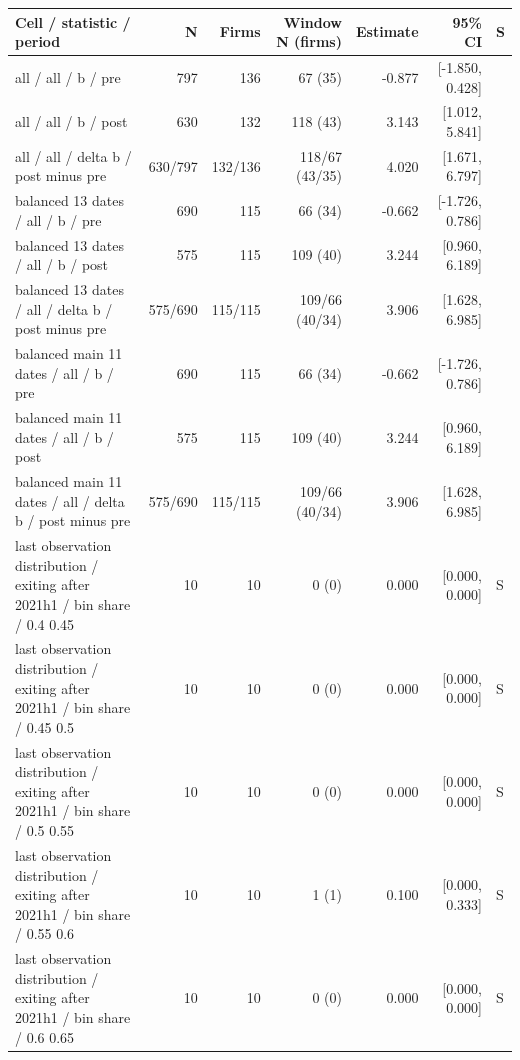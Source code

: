 \begingroup\scriptsize\setlength{\tabcolsep}{3pt}
\begin{threeparttable}
\begin{tabular}{p{5.7cm}rrrrrl}
\toprule
Cell / statistic / period & N & Firms & Window N (firms) & Estimate & 95\% CI & S \\
\midrule
all / all / b / pre & 797 & 136 & 67 (35) & -0.877 & [-1.850, 0.428] &  \\
all / all / b / post & 630 & 132 & 118 (43) & 3.143 & [1.012, 5.841] &  \\
all / all / delta b / post minus pre & 630/797 & 132/136 & 118/67 (43/35) & 4.020 & [1.671, 6.797] &  \\
balanced 13 dates / all / b / pre & 690 & 115 & 66 (34) & -0.662 & [-1.726, 0.786] &  \\
balanced 13 dates / all / b / post & 575 & 115 & 109 (40) & 3.244 & [0.960, 6.189] &  \\
balanced 13 dates / all / delta b / post minus pre & 575/690 & 115/115 & 109/66 (40/34) & 3.906 & [1.628, 6.985] &  \\
balanced main 11 dates / all / b / pre & 690 & 115 & 66 (34) & -0.662 & [-1.726, 0.786] &  \\
balanced main 11 dates / all / b / post & 575 & 115 & 109 (40) & 3.244 & [0.960, 6.189] &  \\
balanced main 11 dates / all / delta b / post minus pre & 575/690 & 115/115 & 109/66 (40/34) & 3.906 & [1.628, 6.985] &  \\
last observation distribution / exiting after 2021h1 / bin share / 0.4 0.45 & 10 & 10 & 0 (0) & 0.000 & [0.000, 0.000] & S \\
last observation distribution / exiting after 2021h1 / bin share / 0.45 0.5 & 10 & 10 & 0 (0) & 0.000 & [0.000, 0.000] & S \\
last observation distribution / exiting after 2021h1 / bin share / 0.5 0.55 & 10 & 10 & 0 (0) & 0.000 & [0.000, 0.000] & S \\
last observation distribution / exiting after 2021h1 / bin share / 0.55 0.6 & 10 & 10 & 1 (1) & 0.100 & [0.000, 0.333] & S \\
last observation distribution / exiting after 2021h1 / bin share / 0.6 0.65 & 10 & 10 & 0 (0) & 0.000 & [0.000, 0.000] & S \\
\bottomrule
\end{tabular}
\begin{tablenotes}[flushleft]\footnotesize

\end{tablenotes}
\end{threeparttable}
